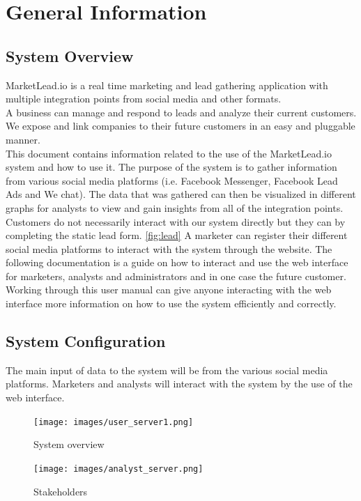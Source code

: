 \documentclass{article}
\begin{document}
	\cleardoublepage
	\tableofcontents
	\cleardoublepage
	
	\section{General Information}
		\subsection{System Overview}
			MarketLead.io is a real time marketing and lead gathering application with multiple integration points from social media and other formats.\\
			A business can manage and respond to leads and analyze their current customers. We expose and link companies to their future customers in an easy and pluggable manner.\\
			This document contains information related to the use of the MarketLead.io system and how to use it. The purpose of the system is to gather information from various social media platforms (i.e. Facebook Messenger, Facebook Lead Ads and We chat).
			The data that was gathered can then be visualized in different graphs for analysts to view and gain insights from all of the integration points. Customers do not necessarily interact with our system directly but they can by completing the static lead form. \ref{fig:lead}
			A marketer can register their different social media platforms to interact with the system through the website.
			The following documentation is a guide on how to interact and use the web interface for marketers, analysts and administrators and in one case the future customer.
			Working through this user manual can give anyone interacting with the web interface more information on how to use the system efficiently and correctly.

		\subsection{System Configuration}
			The main input of data to the system will be from the various social media platforms.
			Marketers and analysts will interact with the system by the use of the web interface.
			\begin{figure}[H]
				\texttt{[image: images/user\_server1.png]}
				\caption{System overview}
				\label{fig:sysOverview}
			\end{figure}

			\begin{figure}[H]
				\texttt{[image: images/analyst\_server.png]}
				\caption{Stakeholders}
				\label{fig:stakeholders}
			\end{figure}
\end{document}
